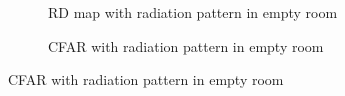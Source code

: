 \documentclass[12pt,DIV14,BCOR12mm,a4paper,footinclude=false,headinclude,parskip=half-,twoside,openright,cleardoublepage=empty,toc=index,bibliography=totoc,listof=totoc]{scrreprt}
\numberwithin{equation}{chapter}
\begin{document}
\begin{figure}[t]
        \centering
        \begin{subfigure}{0.45\textwidth}
            \centering
            \caption{RD map with radiation pattern in empty room}
        \end{subfigure}\hspace{0.5cm}
        \begin{subfigure}{0.45\textwidth}
            \centering
            \caption{CFAR with radiation pattern in empty room}
        \end{subfigure}

\end{figure}
\end{document}
